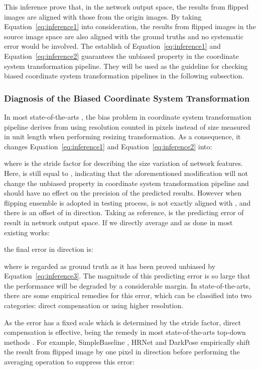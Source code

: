 \documentclass[10pt,journal,compsoc]{IEEEtran}
\begin{document}
This inference prove that, in the network output space, the results from flipped images are aligned with those from the origin images. By taking Equation~\ref{eq:inference1} into consideration, the results from flipped images in the source image space are also aligned with the ground truths and no systematic error would be involved. The establish of Equation~\ref{eq:inference1} and Equation~\ref{eq:inference2} guarantees the unbiased property in the coordinate system transformation pipeline. They will be used as the guideline for checking biased coordinate system transformation pipelines in the following subsection.
\subsubsection{Diagnosis of the Biased Coordinate System Transformation}
\label{sec:decst}
In most state-of-the-arts \cite{CPN,SBNet,MSPN,HRNet,Higher}, the bias problem in coordinate system transformation pipeline derives from using resolution  counted in pixels instead of size  measured in unit length when performing resizing transformation. As a consequence, it changes Equation~\ref{eq:inference1} and Equation~\ref{eq:inference2} into:


where  is the stride factor for describing the size variation of network features. Here,  is still equal to , indicating that the aforementioned modification will not change the unbiased property in coordinate system transformation pipeline  and should have no effect on the precision of the predicted results. However when flipping ensemble is adopted in testing process,  is not exactly aligned with , and there is an offset of  in  direction. Taking  as reference,  is the predicting error of result  in network output space. If we directly average  and  as done in most existing works:

the final error in  direction is:

where  is regarded as ground truth as it has been proved unbiased by Equation~\ref{eq:inference3}. The magnitude of this predicting error is so large that the performance will be degraded by a considerable margin. In state-of-the-arts, there are some empirical remedies for this error, which can be classified into two categories: direct compensation or using higher resolution.


As the error  has a fixed scale which is determined by the stride factor, direct compensation is effective, being the remedy in most state-of-the-arts top-down methods \cite{CPN, MSPN, SBNet, HRNet, DARK}. For example, SimpleBaseline \cite{SBNet}, HRNet \cite{HRNet} and DarkPose \cite{DARK} empirically shift the result from flipped image by one pixel in  direction before performing the averaging operation to suppress this error:
\end{document}
